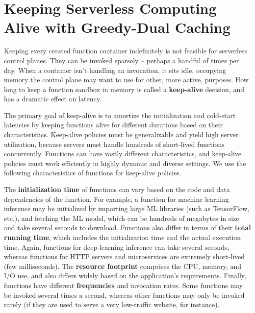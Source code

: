 \chapter{Keeping Serverless Computing Alive with Greedy-Dual Caching}
\label{chap:faascache}

Keeping every created function container indefinitely is not feasible for serverless control planes.
They can be invoked sparsely -- perhaps a handful of times per day.
When a container isn't handling an invocation, it sits idle, occupying memory the control plane may want to use for other, more active, purposes.
How long to keep a function sandbox in memory is called a \textbf{keep-alive} decision, and has a dramatic effect on latency.

The primary goal of keep-alive is to amortize the initialization and cold-start latencies by keeping functions alive for different durations based on their characteristics.
Keep-alive policies must be generalizable and yield high server utilization, because servers must handle hundreds of short-lived functions concurrently.
Functions can have vastly different characteristics, and keep-alive policies must work efficiently in highly dynamic and diverse settings.
We use the following characteristics of functions for keep-alive policies.

The \textbf{initialization time} of functions can vary based on the code and data dependencies of the function.  
For example, a function for machine learning inference may be initialized by importing large ML libraries (such as TensorFlow, etc.), and fetching the ML model, which can be hundreds of megabytes in size and take several seconds to download. 
Functions also differ in terms of their \textbf{total running time}, which includes the initialization time and the actual execution time. 
Again, functions for deep-learning inference can take several seconds, whereas functions for HTTP servers and microservices are extremely short-lived (few milliseconds). 
The \textbf{resource footprint} comprises the CPU, memory, and I/O use, and also differs widely based on the application's requirements. 
Finally, functions have different \textbf{frequencies} and invocation rates. Some functions may be invoked several times a second, whereas other functions may only be invoked rarely (if they are used to serve a very low-traffic website, for instance). 






